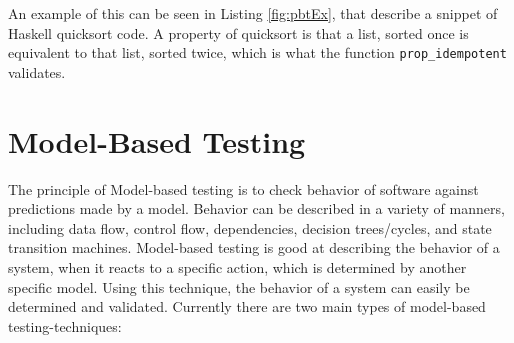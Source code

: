 An example of this can be seen in Listing \ref{fig:pbtEx}, that describe a snippet of Haskell quicksort code. A property of quicksort is that a list, sorted once is equivalent to that list, sorted twice, which is what the function \lstinline{prop_idempotent} validates.

\section{Model-Based Testing}

The principle of Model-based testing is to check behavior of software against predictions made by a model. Behavior can be described in a variety of manners, including data flow, control flow, dependencies, decision trees/cycles, and state transition machines. Model-based testing is good at describing the behavior of a system, when it reacts to a specific action, which is determined by another specific model. Using this technique, the behavior of a system can easily be determined and validated. Currently there are two main types of model-based testing-techniques:

